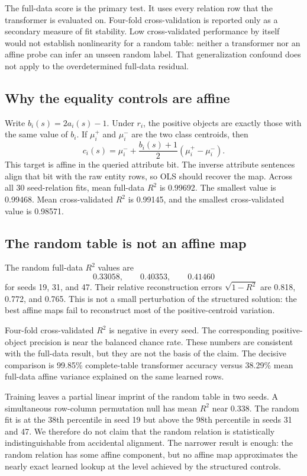 \documentclass[11pt]{article}
\begin{document}
The full-data score is the primary test.  It uses every relation row that the
transformer is evaluated on.  Four-fold cross-validation is reported only as a
secondary measure of fit stability.  Low cross-validated performance by itself
would not establish nonlinearity for a random table: neither a transformer nor
an affine probe can infer an unseen random label.  That generalization
confound does not apply to the overdetermined full-data residual.

\subsection{Why the equality controls are affine}

Write $b_i(s)=2a_i(s)-1$.  Under $r_i$, the positive objects are exactly those
with the same value of $b_i$.  If $\mu_i^+$ and $\mu_i^-$ are the two class
centroids, then
\[
  c_i(s)=\mu_i^-+
  \frac{b_i(s)+1}{2}(\mu_i^+-\mu_i^-).
\]
This target is affine in the queried attribute bit.  The inverse attribute
sentences align that bit with the raw entity rows, so OLS should recover the
map.  Across all 30 seed-relation fits, mean full-data $R^2$ is 0.99692.  The
smallest value is 0.99468.  Mean cross-validated $R^2$ is 0.99145, and the
smallest cross-validated value is 0.98571.

\subsection{The random table is not an affine map}

The random full-data $R^2$ values are
\[
  0.33058,\qquad 0.40353,\qquad 0.41460
\]
for seeds 19, 31, and 47.  Their relative reconstruction errors
$\sqrt{1-R^2}$ are 0.818, 0.772, and 0.765.  This is not a small perturbation of
the structured solution: the best affine maps fail to reconstruct most of the
positive-centroid variation.

Four-fold cross-validated $R^2$ is negative in every seed.  The corresponding
positive-object precision is near the balanced chance rate.  These numbers are
consistent with the full-data result, but they are not the basis of the claim.
The decisive comparison is 99.85\% complete-table transformer accuracy versus
38.29\% mean full-data affine variance explained on the same learned rows.

Training leaves a partial linear imprint of the random table in two seeds.  A
simultaneous row-column permutation null has mean $R^2$ near 0.338.  The random
fit is at the 38th percentile in seed 19 but above the 98th percentile in seeds
31 and 47.  We therefore do not claim that the random relation is statistically
indistinguishable from accidental alignment.  The narrower result is enough:
the random relation has some affine component, but no affine map approximates
the nearly exact learned lookup at the level achieved by the structured
controls.
\end{document}
